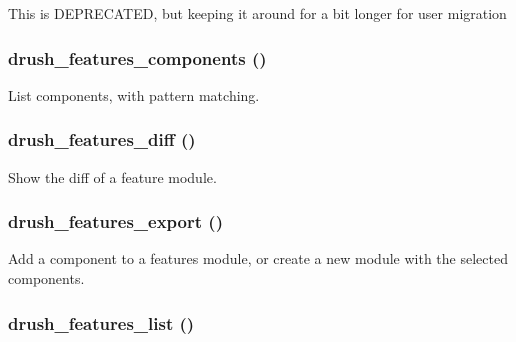 This is DEPRECATED, but keeping it around for a bit longer for user migration \hypertarget{features_8drush_8inc_a8018fdcee7b58fd3a05ca4a7688db1f4}{
\subsubsection[{drush\_\-features\_\-components}]{\setlength{\rightskip}{0pt plus 5cm}drush\_\-features\_\-components ()}}
\label{features_8drush_8inc_a8018fdcee7b58fd3a05ca4a7688db1f4}
List components, with pattern matching. \hypertarget{features_8drush_8inc_a920aff13747c72e9657c0542707ebb87}{
\subsubsection[{drush\_\-features\_\-diff}]{\setlength{\rightskip}{0pt plus 5cm}drush\_\-features\_\-diff ()}}
\label{features_8drush_8inc_a920aff13747c72e9657c0542707ebb87}
Show the diff of a feature module. \hypertarget{features_8drush_8inc_a0eae3a9ca889fd7820b3556c5167d0dd}{
\subsubsection[{drush\_\-features\_\-export}]{\setlength{\rightskip}{0pt plus 5cm}drush\_\-features\_\-export ()}}
\label{features_8drush_8inc_a0eae3a9ca889fd7820b3556c5167d0dd}
Add a component to a features module, or create a new module with the selected components. \hypertarget{features_8drush_8inc_a65af07a0ebc9889a8bc4ae56b860d756}{
\subsubsection[{drush\_\-features\_\-list}]{\setlength{\rightskip}{0pt plus 5cm}drush\_\-features\_\-list ()}}
